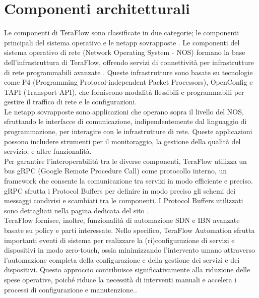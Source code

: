 \section{Componenti architetturali}
Le componenti di TeraFlow sono classificate in due categorie; le componenti principali del sistema operativo e le netapp sovrapposte \cite{Component}. 
Le componenti del sistema operativo di rete (Network Operating System - NOS) formano la base dell'infrastruttura di TeraFlow, offrendo servizi di connettività per infrastrutture di rete programmabili avanzate \cite{Component}. %
Queste infrastrutture sono basate su tecnologie come P4 (Programming Protocol-independent Packet Processors), OpenConfig e TAPI (Transport API), che forniscono modalità flessibili e programmabili per gestire il traffico di rete e le configurazioni.
\\Le netapp sovrapposte sono applicazioni che operano sopra il livello del NOS, sfruttando le interfacce di comunicazione, indipendentemente dal linguaggio di programmazione, per interagire con le infrastrutture di rete.
Queste applicazioni possono includere strumenti per il monitoraggio, la gestione della qualità del servizio, e altre funzionalità.
\\Per garantire l'interoperabilità tra le diverse componenti, TeraFlow utilizza un bus gRPC (Google Remote Procedure Call) come protocollo interno, 
un framework che consente la comunicazione tra servizi in modo efficiente e preciso. 
gRPC sfrutta i Protocol Buffers per definire in modo preciso gli schemi dei messaggi condivisi e scambiati tra le componenti. %
I Protocol Buffers utilizzati sono dettagliati nella pagina dedicata del sito \cite{ProtoBuf}.
\\TeraFlow fornisce, inoltre, funzionalità di automazione SDN e IBN avanzate basate su policy e parti interessate. Nello specifico, TeraFlow Automation sfrutta 
importanti eventi di sistema per realizzare la (ri)configurazione di servizi e dispositivi in modo zero-touch, ossia minimizzando l'intervento umano attraverso l'automazione completa della configurazione e della gestione dei servizi e dei dispositivi.
Questo approccio contribuisce significativamente alla riduzione delle spese operative, poiché riduce la necessità di interventi manuali e accelera i processi di configurazione e manutenzione.\cite{Component}.
